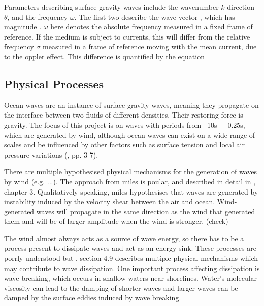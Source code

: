 Parameters describing surface gravity waves include the wavenumber $k$ direction $\theta$, and the frequency $\omega$. The first two describe the wave vector , which has magnitude . $\omega$ here denotes the absolute frequency measured in a fixed frame of reference. If the medium is subject to currents, this will differ from the relative frequency $\sigma$ measured in a frame of reference moving with the mean current, due to the oppler effect. This difference is quantified by the equation
=======
\subsection{Physical Processes}

Ocean waves are an instance of surface gravity waves, meaning they propagate on the interface between two fluids of different densities. Their restoring force is gravity. The focus of this project is on waves with periods from ~10s - ~0.25s, which are generated by wind, although ocean waves can exist on a wide range of scales and be influenced by other factors such as surface tension and local air pressure variations (\cite{Holthuijsen2007}, pp. 3-7).

There are multiple hypothesised physical mechanisms for the generation of waves by wind (e.g. ...). The approach from miles is poular, and described in detail in \citet{Janssen2004}, chapter 3. Qualitatively speaking, miles hypothesises that waves are generated by instability induced by the velocity shear between the air and ocean. Wind-generated waves will propagate in the same direction as the wind that generated them and will be of larger amplitude when the wind is stronger. (check)

The wind almost always acts as a source of wave energy, so there has to be a process present to dissipate waves and act as an energy sink. These processes are porrly understood but \citet{Janssen2004}, section 4.9 describes multiple physical mechanisms which may contribute to wave dissipation. One important process affecting dissipation is wave breaking, which occurs in shallow waters near shorelines. Water's molecular viscosity can lead to the damping of shorter waves and larger waves can be damped by the surface eddies induced by wave breaking.

